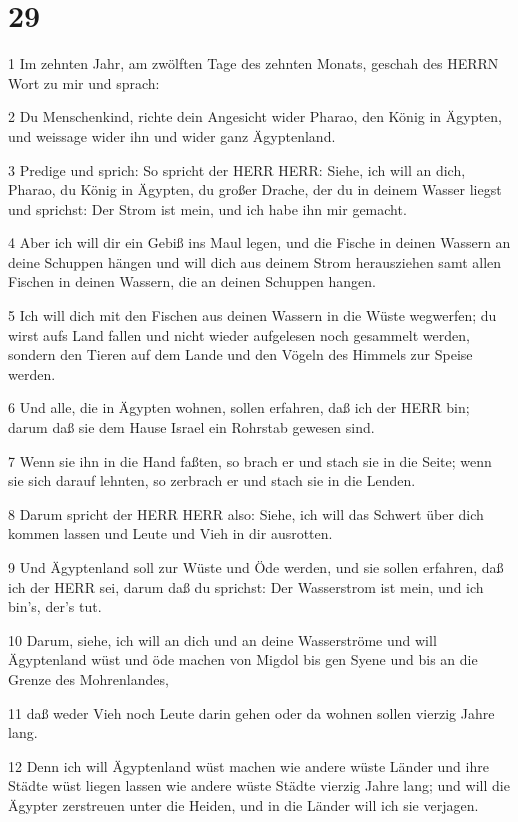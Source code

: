 \chapter{29}

\par 1 Im zehnten Jahr, am zwölften Tage des zehnten Monats, geschah des HERRN Wort zu mir und sprach:
\par 2 Du Menschenkind, richte dein Angesicht wider Pharao, den König in Ägypten, und weissage wider ihn und wider ganz Ägyptenland.
\par 3 Predige und sprich: So spricht der HERR HERR: Siehe, ich will an dich, Pharao, du König in Ägypten, du großer Drache, der du in deinem Wasser liegst und sprichst: Der Strom ist mein, und ich habe ihn mir gemacht.
\par 4 Aber ich will dir ein Gebiß ins Maul legen, und die Fische in deinen Wassern an deine Schuppen hängen und will dich aus deinem Strom herausziehen samt allen Fischen in deinen Wassern, die an deinen Schuppen hangen.
\par 5 Ich will dich mit den Fischen aus deinen Wassern in die Wüste wegwerfen; du wirst aufs Land fallen und nicht wieder aufgelesen noch gesammelt werden, sondern den Tieren auf dem Lande und den Vögeln des Himmels zur Speise werden.
\par 6 Und alle, die in Ägypten wohnen, sollen erfahren, daß ich der HERR bin; darum daß sie dem Hause Israel ein Rohrstab gewesen sind.
\par 7 Wenn sie ihn in die Hand faßten, so brach er und stach sie in die Seite; wenn sie sich darauf lehnten, so zerbrach er und stach sie in die Lenden.
\par 8 Darum spricht der HERR HERR also: Siehe, ich will das Schwert über dich kommen lassen und Leute und Vieh in dir ausrotten.
\par 9 Und Ägyptenland soll zur Wüste und Öde werden, und sie sollen erfahren, daß ich der HERR sei, darum daß du sprichst: Der Wasserstrom ist mein, und ich bin's, der's tut.
\par 10 Darum, siehe, ich will an dich und an deine Wasserströme und will Ägyptenland wüst und öde machen von Migdol bis gen Syene und bis an die Grenze des Mohrenlandes,
\par 11 daß weder Vieh noch Leute darin gehen oder da wohnen sollen vierzig Jahre lang.
\par 12 Denn ich will Ägyptenland wüst machen wie andere wüste Länder und ihre Städte wüst liegen lassen wie andere wüste Städte vierzig Jahre lang; und will die Ägypter zerstreuen unter die Heiden, und in die Länder will ich sie verjagen.
